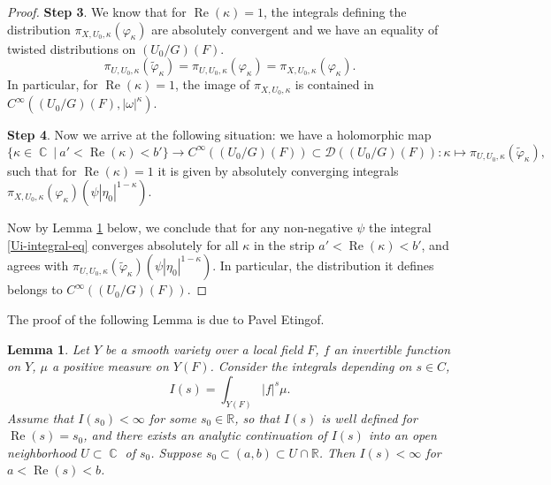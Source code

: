 \documentclass[12pt,reqno]{amsart}
\DeclareMathOperator\C{\mathbb C}
\newtheorem{lemma}[theorem]{Lemma}
\theoremstyle{definition}
\theoremstyle{remark}
\numberwithin{equation}{section}
\newcommand{\wt}{\widetilde}
\newcommand{\DD}{{\mathcal D}}
\newcommand{\sub}{\subset}
\newcommand{\om}{\omega}
\newcommand{\fg}{{\mathfrak g}}
\newcommand{\vol}{{\operatorname{vol}}}
\newcommand{\R}{{\mathbb R}}
\begin{document}
\begin{proof}

\medskip

\noindent
{\bf Step 3}. We know that for $\operatorname{Re}(\kappa)=1$,
the integrals defining the distribution $\pi_{X,U_0,\kappa}(\varphi_{\kappa})$
are absolutely convergent 
and we have an equality of twisted distributions on $(U_0/G)(F)$.
$$\pi_{U,U_0,\kappa}(\wt{\varphi}_{\kappa})=\pi_{U,U_0,\kappa}(\varphi_{\kappa})=\pi_{X,U_0,\kappa}(\varphi_\kappa).$$
In particular, for $\operatorname{Re}(\kappa)=1$, the image of $\pi_{X,U_0,\kappa}$ is contained in $C^\infty((U_0/G)(F),|\om|^{\kappa})$.

\medskip

\noindent
{\bf Step 4}. Now we arrive at the following situation: we have a holomorphic map 
$$\{\kappa\in\C \ |\ a'<\operatorname{Re}(\kappa)<b'\}\to C^\infty((U_0/G)(F))\sub \DD((U_0/G)(F)):\kappa\mapsto \pi_{U,U_0,\kappa}(\wt{\varphi}_{\kappa}),$$
such that for $\operatorname{Re}(\kappa)=1$ it is given by absolutely converging integrals $\pi_{X,U_0,\kappa}(\varphi_{\kappa})(\psi |\eta_0|^{1-\kappa})$.

Now by Lemma \ref{anal-cont-lem} below, we conclude that for any non-negative $\psi$ the integral
\eqref{Ui-integral-eq} converges absolutely
for all $\kappa$ in the strip $a'<\operatorname{Re}(\kappa)<b'$, and agrees with $\pi_{U,U_0,\kappa}(\wt{\varphi}_{\kappa})(\psi |\eta_0|^{1-\kappa})$.
In particular, the distribution it defines belongs to $C^\infty((U_0/G)(F))$.
\end{proof}

The proof of the following Lemma is due to Pavel Etingof.

\begin{lemma}\label{anal-cont-lem}
Let $Y$ be a smooth variety over a local field $F$, $f$ an invertible function on $Y$, $\mu$ a positive measure on $Y(F)$.
Consider the integrals depending on $s\in C$,
$$I(s)=\int_{Y(F)}|f|^s \mu.$$
Assume that $I(s_0)<\infty$ for some $s_0\in\R$, so that $I(s)$ is well defined for $\operatorname{Re}(s)=s_0$, and  
there exists an analytic continuation of $I(s)$ into an open neighborhood $U\sub \C$ of $s_0$.
Suppose $s_0\sub (a,b)\sub U\cap \R$.
Then $I(s)<\infty$ for $a<\operatorname{Re}(s)<b$.
\end{lemma}
\end{document}

